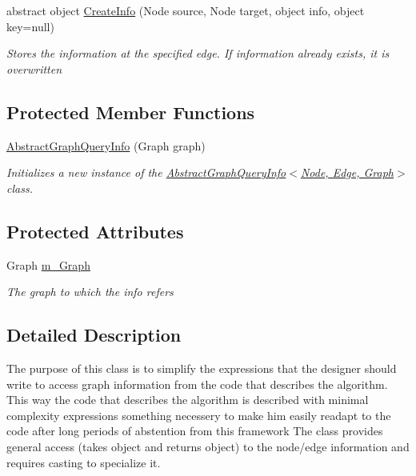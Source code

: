 \begin{DoxyCompactItemize}
abstract object \hyperlink{class_graph_library_1_1_generics_1_1_abstract_graph_query_info_ad555b8fc4849bc003f0d457414edcb26}{Create\+Info} (Node source, Node target, object info, object key=null)
\begin{DoxyCompactList}\small\item\em Stores the information at the specified edge. If information already exists, it is overwritten \end{DoxyCompactList}\end{DoxyCompactItemize}
\subsection*{Protected Member Functions}
\begin{DoxyCompactItemize}
\item 
\hyperlink{class_graph_library_1_1_generics_1_1_abstract_graph_query_info_a8dd567e7f04df4a55df4bd8b4a0c3e48}{Abstract\+Graph\+Query\+Info} (Graph graph)
\begin{DoxyCompactList}\small\item\em Initializes a new instance of the \hyperlink{class_graph_library_1_1_generics_1_1_abstract_graph_query_info_a8dd567e7f04df4a55df4bd8b4a0c3e48}{Abstract\+Graph\+Query\+Info$<$\+Node, Edge, Graph$>$} class. \end{DoxyCompactList}\end{DoxyCompactItemize}
\subsection*{Protected Attributes}
\begin{DoxyCompactItemize}
\item 
Graph \hyperlink{class_graph_library_1_1_generics_1_1_abstract_graph_query_info_a7f1d5e09659d1e98da56197e1cc5973a}{m\+\_\+\+Graph}
\begin{DoxyCompactList}\small\item\em The graph to which the info refers \end{DoxyCompactList}\end{DoxyCompactItemize}


\subsection{Detailed Description}
The purpose of this class is to simplify the expressions that the designer should write to access graph information from the code that describes the algorithm. This way the code that describes the algorithm is described with minimal complexity expressions something necessery to make him easily readapt to the code after long periods of abstention from this framework The class provides general access (takes object and returns object) to the node/edge information and requires casting to specialize it. 


